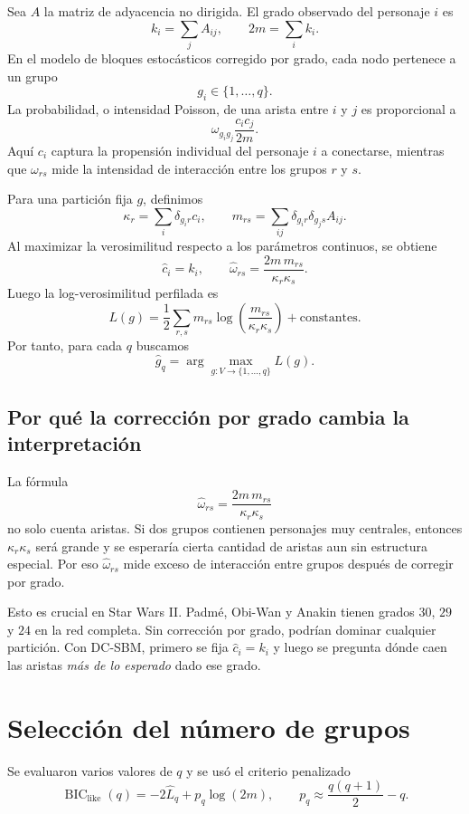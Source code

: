 \documentclass[11pt,letterpaper]{article}
\begin{document}
Sea $A$ la matriz de adyacencia no dirigida. El grado observado del personaje $i$ es
\[
k_i=\sum_j A_{ij},
\qquad
2m=\sum_i k_i.
\]
En el modelo de bloques estocásticos corregido por grado, cada nodo pertenece a un grupo
\[
g_i\in\{1,\ldots,q\}.
\]
La probabilidad, o intensidad Poisson, de una arista entre $i$ y $j$ es proporcional a
\[
\omega_{g_i g_j}\frac{c_i c_j}{2m}.
\]
Aquí $c_i$ captura la propensión individual del personaje $i$ a conectarse, mientras que $\omega_{rs}$ mide la intensidad de interacción entre los grupos $r$ y $s$.

Para una partición fija $g$, definimos
\[
\kappa_r=\sum_i \delta_{g_i r}c_i,
\qquad
m_{rs}=\sum_{ij}\delta_{g_i r}\delta_{g_j s}A_{ij}.
\]
Al maximizar la verosimilitud respecto a los parámetros continuos, se obtiene
\[
\hat c_i=k_i,
\qquad
\hat\omega_{rs}=\frac{2m\,m_{rs}}{\kappa_r\kappa_s}.
\]
Luego la log-verosimilitud perfilada es
\[
L(g)=
\frac{1}{2}\sum_{r,s}
m_{rs}\log\left(\frac{m_{rs}}{\kappa_r\kappa_s}\right)
+\text{constantes}.
\]
Por tanto, para cada $q$ buscamos
\[
\hat g_q=\arg\max_{g:V\to\{1,\ldots,q\}}L(g).
\]

\subsection{Por qué la corrección por grado cambia la interpretación}

La fórmula
\[
\hat\omega_{rs}=\frac{2m\,m_{rs}}{\kappa_r\kappa_s}
\]
no solo cuenta aristas. Si dos grupos contienen personajes muy centrales, entonces $\kappa_r\kappa_s$ será grande y se esperaría cierta cantidad de aristas aun sin estructura especial. Por eso $\hat\omega_{rs}$ mide exceso de interacción entre grupos después de corregir por grado.

Esto es crucial en Star Wars II. Padmé, Obi-Wan y Anakin tienen grados $30$, $29$ y $24$ en la red completa. Sin corrección por grado, podrían dominar cualquier partición. Con DC-SBM, primero se fija $\hat c_i=k_i$ y luego se pregunta dónde caen las aristas \emph{más de lo esperado} dado ese grado.

\section{Selección del número de grupos}

Se evaluaron varios valores de $q$ y se usó el criterio penalizado
\[
\operatorname{BIC}_{\mathrm{like}}(q)
=-2\hat L_q+p_q\log(2m),
\qquad
p_q\approx \frac{q(q+1)}{2}-q.
\]
\end{document}
